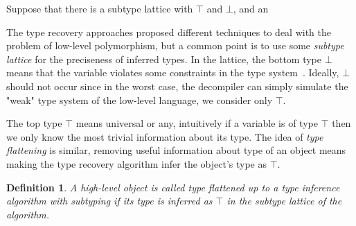 \documentclass[compsoc,conference,a4paper,10pt,times]{IEEEtran}
\newtheorem{definition}{Definition}
\begin{document}




Suppose that there is a subtype lattice with $\top$ and $\bot$, and an 

The type recovery approaches proposed different techniques to deal with the problem of
low-level polymorphism, but a common point
is to use some \emph{subtype lattice}
for the preciseness of inferred types. In the lattice, the bottom type $\bot$ means
that the variable violates some constraints in the type system~\cite{lee_tie_2011}.
Ideally, $\bot$ should not occur since in the worst case, the decompiler can simply
simulate the "weak" type system of the low-level language, we consider only $\top$.

The top type $\top$ means universal or any, intuitively if a variable is of type $\top$ then we only
know the most trivial information about its type.
The idea of \emph{type flattening} is similar, removing useful information about type
of an object means making the type recovery algorithm infer the object's type as $\top$.

\begin{definition}
  A high-level object is called type flattened up to a type inference algorithm with subtyping
  if its type is inferred as $\top$ in the subtype lattice of the algorithm.
\end{definition}
\end{document}
